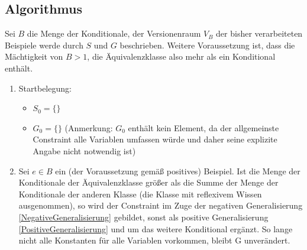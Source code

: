 \documentclass[draft]{scrreprt}
\begin{document}
	\subsection{Algorithmus}
	Sei $ B $ die Menge der Konditionale, der Versionenraum $ V_B $ der bisher verarbeiteten Beispiele werde durch $ S $ und  $ G $ beschrieben. Weitere Voraussetzung ist, dass die Mächtigkeit von $ B  > 1$, die Äquivalenzklasse also mehr als ein Konditional enthält.  
	\begin{enumerate}
		\item Startbelegung:
		\begin{itemize}
			\item $ S_0 = \{\}$ 
			\item $ G_0 = \{\} $ (Anmerkung: $ G_0 $ enthält kein Element, da der allgemeinste Constraint alle Variablen umfassen würde und daher seine explizite Angabe nicht notwendig ist)
		\end{itemize}
		\item Sei $ e \in B $ ein (der Voraussetzung gemäß positives) Beispiel. Ist die Menge der Konditionale der Äquivalenzklasse größer als die Summe der Menge der Konditionale der anderen Klasse (die Klasse mit reflexivem Wissen ausgenommen), so wird der Constraint im Zuge der negativen Generalisierung \ref{NegativeGeneralisierung} gebildet, sonst als positive Generalisierung \ref{PositiveGeneralisierung} und um das weitere Konditional ergänzt. So lange nicht alle Konstanten für alle Variablen vorkommen, bleibt G unverändert. 
	\end{enumerate}
\end{document}
